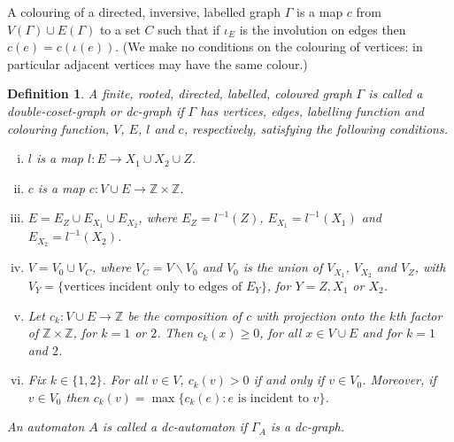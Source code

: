 \documentclass[a4paper,12pt]{article}
\def\i{\iota }
\def\G{\Gamma }
\newtheorem{definition}[theorem]{Definition}
\numberwithin{equation}{section}
\numberwithin{figure}{section}
\newcommand{\ZZ}{\ensuremath{\mathbb{Z}}}
\newcommand{\maps}{\rightarrow}
\newcommand{\bs}{\backslash}
\newcommand{\be}{\begin{enumerate}}
\newcommand{\ee}{\end{enumerate}}
\begin{document}
A colouring of a directed, inversive, labelled graph $\G$ is a map $c$  from $V(\G)\cup E(\G)$
 to a set $C$ such that if $\i_E$ is the involution on edges 
then $c(e)=c(\i(e))$. (We make no conditions on the colouring of vertices:
in particular adjacent vertices may have the same colour.)

\begin{definition}
A finite, rooted, directed, labelled, coloured graph $\G$ is called a 
{\em double-coset-graph} or 
{\em dc-graph}
if $\G$ has vertices, edges, labelling function and colouring function,
 $V$, $E$, $l$ and $c$, 
respectively, satisfying the following conditions.
\be[(i)]
\item $l$ is a map $l:E\maps X_1\cup X_2\cup Z$.
\item $c$ is a map $c:V\cup E\maps \ZZ\times \ZZ$. 
\item $E=E_Z\cup E_{X_1}\cup E_{X_2}$,
where $E_Z=l^{-1}(Z)$, $E_{X_1}=l^{-1}(X_1)$ and $E_{X_2}=l^{-1}(X_2)$.
\item $V=V_0\cup V_C$, where $V_C=V\bs V_0$ and 
$V_0$ is the union of 
$V_{X_1}$, $V_{X_2}$ and $V_Z$, with   
$V_Y=\{\textrm{vertices incident only to edges of } E_Y\}$, for $Y=Z,X_1$ or $X_2$. 
\item Let $c_k:V\cup E\maps \ZZ$ be the composition of $c$ with projection
onto the $k$th factor of $\ZZ\times \ZZ$, for $k=1$ or $2$. Then 
$c_k(x)\ge 0$, for all $x\in V\cup E$ and  for $k=1$ and $2$. 
\item Fix $k\in \{1,2\}$.  For all $v\in V$,  
$c_k(v)>0$ if and only if $v\in V_0$. Moreover, if $v\in V_0$ then
$c_k(v)=\max\{c_k(e): e \textrm{ is incident to } v\}$. 
\ee
An automaton $A$ is called a {\em dc-automaton} if $\G_A$ is  a dc-graph.
\end{definition}
\end{document}
